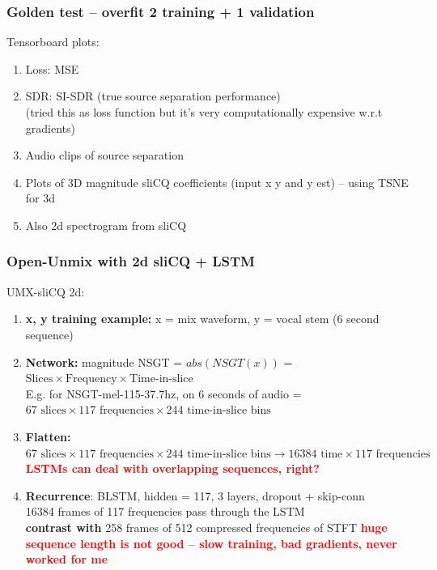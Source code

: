 \documentclass[usenames,dvipsnames]{beamer}
\begin{document}
\begin{frame}
	\frametitle{Golden test -- overfit 2 training + 1 validation}
	Tensorboard plots:
	\begin{enumerate}
		\item
			Loss: MSE
		\item
			SDR: SI-SDR (true source separation performance)\\
			(tried this as loss function but it's very computationally expensive w.r.t gradients)
		\item
			Audio clips of source separation
		\item
			Plots of 3D magnitude sliCQ coefficients (input x y and y est) -- using TSNE for 3d
		\item
			Also 2d spectrogram from sliCQ
	\end{enumerate}
\end{frame}

\begin{frame}
	\frametitle{Open-Unmix with 2d sliCQ + LSTM}
	UMX-sliCQ 2d:
	\begin{enumerate}
		\item
			\textbf{x, y training example:} x = mix waveform, y = vocal stem (6 second sequence)
		\item
			\textbf{Network:} magnitude NSGT = $abs(NSGT(x))$ = $\text{Slices} \times \text{Frequency} \times \text{Time-in-slice}$\\E.g. for NSGT-mel-115-37.7hz, on 6 seconds of audio = $67 \text{ slices} \times 117 \text{ frequencies} \times 244 \text{ time-in-slice bins} $
		\item
			\textbf{Flatten:} $67 \text{ slices} \times 117 \text{ frequencies} \times 244 \text{ time-in-slice bins} \rightarrow 16384 \text{ time} \times 117 \text { frequencies}$\\
			\textbf{\textcolor{red}{LSTMs can deal with overlapping sequences, right?}}
		\item
			\textbf{Recurrence}: BLSTM, hidden = 117, 3 layers, dropout + skip-conn\\
			16384 frames of 117 frequencies pass through the LSTM\\
			\textbf{contrast with} 258 frames of 512 compressed frequencies of STFT
			\textbf{\textcolor{red}{huge sequence length is not good -- slow training, bad gradients, never worked for me}}
	\end{enumerate}
\end{frame}
\end{document}
